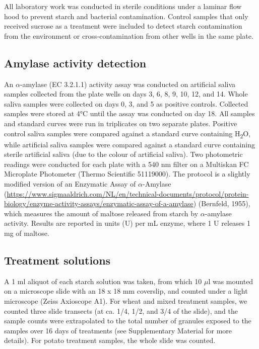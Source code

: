 \documentclass[
]{article}
\begin{document}
All laboratory work was conducted in sterile conditions under a laminar flow hood
to prevent starch and bacterial contamination. Control samples that only received
sucrose as a treatment were included to detect starch contamination from the
environment or cross-contamination from other wells in the same plate.

\hypertarget{amylase-activity-detection}{%
\subsection{Amylase activity detection}\label{amylase-activity-detection}}

An \(\alpha\)-amylase (EC 3.2.1.1) activity assay was conducted on artificial
saliva samples collected from the plate wells on days 3, 6, 8, 9, 10, 12, and 14.
Whole saliva samples were collected on days 0, 3, and 5 as positive controls.
Collected samples were stored at 4°C until the assay was conducted on day 18.
All samples and standard curves were run in triplicates on two separate plates.
Positive control saliva samples were compared against a standard curve containing
H\textsubscript{2}O, while artificial saliva samples were compared against a standard curve
containing sterile artificial saliva (due to the colour of artificial saliva).
Two photometric readings were conducted for each plate with a 540 nm filter on a
Multiskan FC Microplate Photometer (Thermo Scientific 51119000).
The protocol is a slightly modified version of an Enzymatic Assay of \(\alpha\)-Amylase
(\url{https://www.sigmaaldrich.com/NL/en/technical-documents/protocol/protein-biology/enzyme-activity-assays/enzymatic-assay-of-a-amylase}) (Bernfeld, 1955), which measures the amount of
maltose released from starch by \(\alpha\)-amylase activity. Results are reported
in units (U) per mL enzyme, where 1 U releases 1 mg of maltose.

\hypertarget{treatment-solutions}{%
\subsection{Treatment solutions}\label{treatment-solutions}}

A 1 ml aliquot of each starch solution was taken, from which 10 \(\mu\)l was mounted
on a microscope slide with an 18 x 18 mm coverslip, and counted under a light microscope
(Zeiss Axioscope A1). For wheat and mixed treatment samples, we counted three
slide transects (at ca. 1/4, 1/2, and 3/4 of the slide), and the sample counts
were extrapolated to the total number of granules exposed to the samples over 16
days of treatments (see Supplementary Material for more details). For potato
treatment samples, the whole slide was counted.
\end{document}
